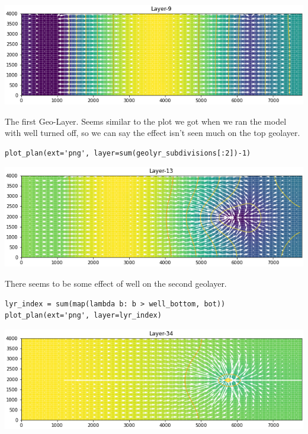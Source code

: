 \documentclass[titlepage,12pt]{unisubmission}
\begin{document}
\begin{center}
\begin{center}
\includegraphics[width=.9\linewidth]{./images/3_plan_layer-9.png}
\end{center}
\end{center}




The first Geo-Layer. Seems similar to the plot we got when we ran the model  with well turned off, so we can say the effect isn't seen much on the top geolayer.

\begin{verbatim}
plot_plan(ext='png', layer=sum(geolyr_subdivisions[:2])-1)
\end{verbatim}

\begin{center}
\begin{center}
\includegraphics[width=.9\linewidth]{./images/3_plan_layer-13.png}
\end{center}
\end{center}


There seems to be some effect of well on the second geolayer.

\begin{verbatim}
lyr_index = sum(map(lambda b: b > well_bottom, bot))
plot_plan(ext='png', layer=lyr_index)
\end{verbatim}

\begin{center}
\begin{center}
\includegraphics[width=.9\linewidth]{./images/3_plan_layer-34.png}
\end{center}
\end{center}
\end{document}
